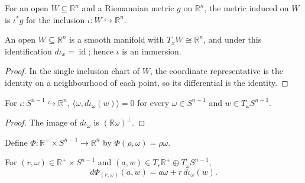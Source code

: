 \begin{definition}
\label{def:open-submanifold-metric}
\leanok
{}
For an open $W\subseteq\mathbb R^n$ and a Riemannian metric $g$ on $\mathbb R^n$, the metric induced on $W$ is $\iota^*g$ for the inclusion $\iota:W\hookrightarrow\mathbb R^n$.
\end{definition}

\begin{lemma}
\label{lem:mfderiv-open-inclusion}
\leanok
An open $W\subseteq\mathbb R^n$ is a smooth manifold with $T_xW\cong\mathbb R^n$, and under this identification $d\iota_x=\operatorname{id}$; hence $\iota$ is an immersion.
\end{lemma}

\begin{proof}
\leanok
\sketch In the single inclusion chart of $W$, the coordinate representative is the identity on a neighbourhood of each point, so its differential is the identity.
\end{proof}

\begin{lemma}
\label{lem:sphere-tangent-orthogonal-radius}
\leanok
{}
For $\iota:S^{n-1}\hookrightarrow\mathbb R^n$, $\langle\omega,d\iota_\omega(w)\rangle=0$ for every $\omega\in S^{n-1}$ and $w\in T_\omega S^{n-1}$.
\end{lemma}

\begin{proof}
\leanok
\sketch The image of $d\iota_\omega$ is $(\mathbb R\omega)^\perp$.
\end{proof}

\begin{definition}
\label{def:polar-map}
\leanok
{}
Define $\Phi:\mathbb R^+\times S^{n-1}\to\mathbb R^n$ by $\Phi(\rho,\omega)=\rho\omega$.
\end{definition}

\begin{lemma}
\label{lem:mfderiv-polar-map}
\leanok
{}
For $(r,\omega)\in\mathbb R^+\times S^{n-1}$ and $(a,w)\in T_r\mathbb R^+\oplus T_\omega S^{n-1}$,
\[
d\Phi_{(r,\omega)}(a,w)=a\omega+r\,d\iota_\omega(w).
\]
\end{lemma}

